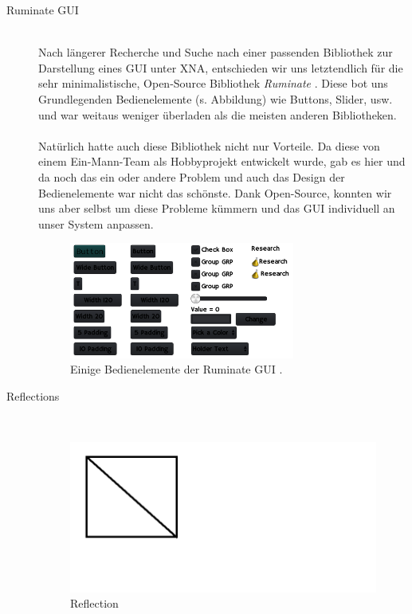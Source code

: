 \begin{Spacing}{\mylinespace}
\begin{description}
	\item[Ruminate GUI] \hfill \\
	Nach längerer Recherche und Suche nach einer passenden Bibliothek zur Darstellung eines GUI unter XNA, entschieden wir uns letztendlich für die sehr minimalistische, Open-Source Bibliothek \textit{Ruminate} \cite{Franks2013}. Diese bot uns Grundlegenden Bedienelemente (s. Abbildung) wie Buttons, Slider, usw. und war weitaus weniger überladen als die meisten anderen Bibliotheken.
\\\\
Natürlich hatte auch diese Bibliothek nicht nur Vorteile. Da diese von einem Ein-Mann-Team als Hobbyprojekt entwickelt wurde, gab es hier und da noch das ein oder andere Problem und auch das Design der Bedienelemente war nicht das schönste. Dank Open-Source, konnten wir uns aber selbst um diese Probleme kümmern und das GUI individuell an unser System anpassen.
	
\begin{figure}[h!]
	\centering
	\vspace*{20px}
	\includegraphics[width=280px]{graphics/ruminate.png}	
	\caption{Einige Bedienelemente der Ruminate GUI \cite{Franks2013}.}
	\label{fig:Ruminate}
\end{figure}
	
	\item[Reflections] \hfill \\
	
\begin{figure}[h!]
	\vspace*{30px}
	\includegraphics[width=\columnwidth]{graphics/reflection.png}	
	\caption{Reflection}
	\label{fig:Reflection}
\end{figure}
	

\end{description}
\end{Spacing}
